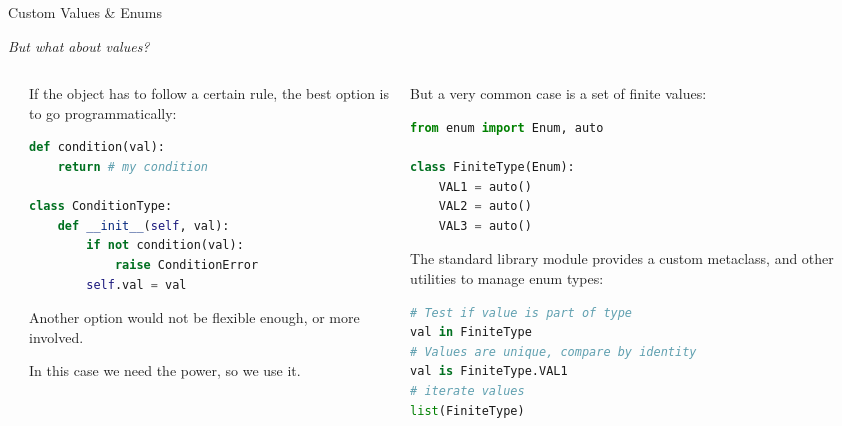 \documentclass[9pt]{beamer}
\begin{document}
\begin{frame}[fragile]{Custom Values \& Enums}
    \vspace*{10pt}
    \begin{center}
        \itshape
        But what about values?
    \end{center}
    \vspace*{20pt}

    \begin{columns}
        \begin{column}{0.03\textwidth}
        \end{column}
        \begin{column}{0.47\textwidth}
            If the object has to follow a certain rule, the best option is to
            go programmatically:

            \begin{lstlisting}[language=Python,style=mystyle]
def condition(val):
    return # my condition

class ConditionType:
    def __init__(self, val):
        if not condition(val):
            raise ConditionError
        self.val = val\end{lstlisting}

            Another option would not be flexible enough, or more involved.

            In this case we need the power, so we use it.
        \end{column}
        \begin{column}{0.47\textwidth}
            But a very common case is a set of finite values:
            \begin{lstlisting}[language=Python,style=mystyle]
from enum import Enum, auto

class FiniteType(Enum):
    VAL1 = auto()
    VAL2 = auto()
    VAL3 = auto()\end{lstlisting}

            The standard library module  provides a custom
            metaclass, and other utilities to manage enum types:
            \begin{lstlisting}[language=Python,style=mystyle]
# Test if value is part of type
val in FiniteType
# Values are unique, compare by identity
val is FiniteType.VAL1
# iterate values
list(FiniteType)\end{lstlisting}
        \end{column}
        \begin{column}{0.03\textwidth}
        \end{column}
    \end{columns}
\end{frame}
\end{document}
